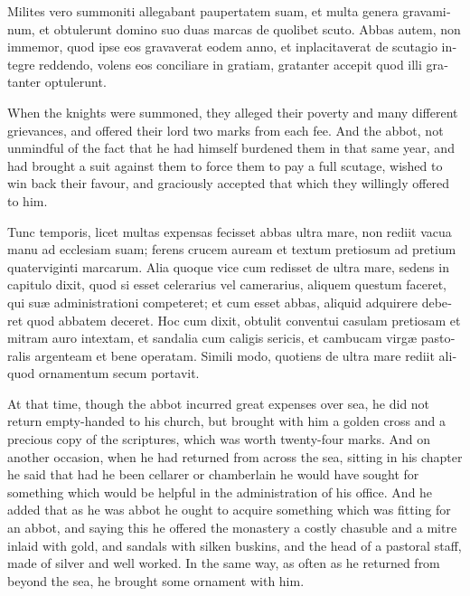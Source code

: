 \documentclass[10pt]{book}
\begin{document}
\begin{paracol}{2}
\switchcolumn*

\begin{otherlanguage}{latin}
Milites vero summoniti allegabant paupertatem suam, et multa genera gravaminum, et obtulerunt domino suo duas marcas de quolibet scuto. Abbas autem, non immemor, quod ipse eos gravaverat eodem anno, et inplacitaverat de scutagio integre reddendo, volens eos conciliare in gratiam, gratanter accepit quod illi gratanter optulerunt. 
\end{otherlanguage}

\switchcolumn

When the knights were summoned, they alleged their poverty and many different grievances, and offered their lord two marks from each fee. And the abbot, not unmindful of the fact that he had himself burdened them in that same year, and had brought a suit against them to force them to pay a full scutage, wished to win back their favour, and graciously accepted that which they willingly offered to him.

\switchcolumn*

\begin{otherlanguage}{latin}
Tunc temporis, licet multas expensas fecisset abbas ultra mare, non rediit vacua manu ad ecclesiam suam; ferens crucem auream et textum pretiosum ad pretium quaterviginti marcarum. Alia quoque vice cum redisset de ultra mare, sedens in capitulo dixit, quod si esset celerarius vel camerarius, aliquem questum faceret, qui su\ae{} administrationi competeret; et cum esset abbas, aliquid adquirere deberet quod abbatem deceret. Hoc cum dixit, obtulit conventui casulam pretiosam et mitram auro intextam, et sandalia cum caligis sericis, et cambucam virg\ae{} pastoralis argenteam et bene operatam. Simili modo, quotiens de ultra mare rediit aliquod ornamentum secum portavit.
\end{otherlanguage}

\switchcolumn

At that time, though the abbot incurred great expenses over sea, he did not return empty-handed to his church, but brought with him a golden cross and a precious copy of the scriptures, which was worth twenty-four marks. And on another occasion, when he had returned from across the sea, sitting in his chapter he said that had he been cellarer or chamberlain he would have sought for something which would be helpful in the administration of his office. And he added that as he was abbot he ought to acquire something which was fitting for an abbot, and saying this he offered the monastery a costly chasuble and a mitre inlaid with gold, and sandals with silken buskins, and the head of a pastoral staff, made of silver and well worked. In the same way, as often as he returned from beyond the sea, he brought some ornament with him.


\end{paracol}
\end{document}
